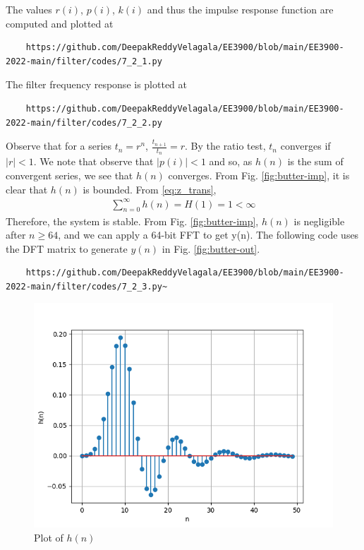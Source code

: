 \documentclass[journal,12pt,twocolumn]{IEEEtran}
\renewcommand\thesection{\arabic{section}}
\begin{document}
\begin{enumerate}[label=\thesection.\arabic*]
The values $r(i)$, $p(i)$, $k(i)$ and thus the impulse response function are computed and plotted at
\begin{lstlisting}
    https://github.com/DeepakReddyVelagala/EE3900/blob/main/EE3900-2022-main/filter/codes/7_2_1.py
\end{lstlisting}
The filter frequency response is plotted at
\begin{lstlisting}
    https://github.com/DeepakReddyVelagala/EE3900/blob/main/EE3900-2022-main/filter/codes/7_2_2.py
\end{lstlisting}
Observe that for a series $t_n = r^n$, $\frac{t_{n + 1}}{t_n} = r$.
By the ratio test, $t_n$ converges if $|r| < 1$. We note that
observe that $|p(i)| < 1$ and so, as $h(n)$ is the sum of convergent series,
we see that $h(n)$ converges. From Fig. \eqref{fig:butter-imp}, it is clear
that $h(n)$ is bounded. From \eqref{eq:z_trans},
\begin{align}
	\sum_{n = 0}^{\infty}h(n) = H(1) = 1 < \infty
\end{align}
Therefore, the system is stable. From
Fig. \eqref{fig:butter-imp}, $h(n)$ is negligible after $n \geq 64$, and we
can apply a 64-bit FFT to get y(n). The following code uses the DFT matrix
to generate $y(n)$ in Fig. \eqref{fig:butter-out}.
\begin{lstlisting}
    https://github.com/DeepakReddyVelagala/EE3900/blob/main/EE3900-2022-main/filter/codes/7_2_3.py~
\end{lstlisting}
\begin{figure}[!htb]
\includegraphics[width=\columnwidth]{figs/7_2_1.png}
\caption{Plot of $h(n)$}
\label{fig:butter-imp}

\end{figure}
\end{enumerate}
\end{document}
